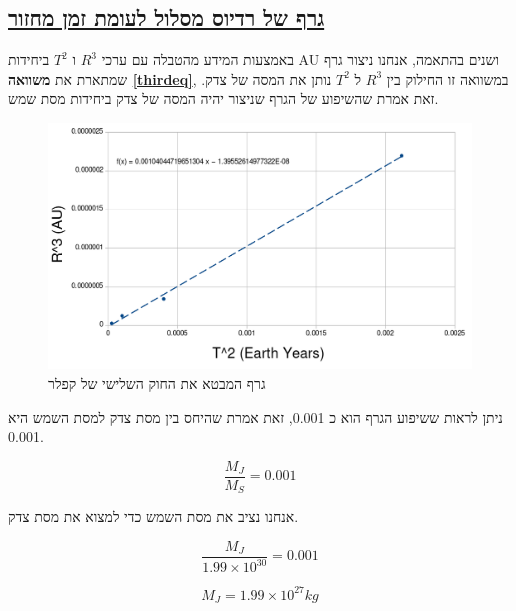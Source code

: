 \documentclass[a4paper, 12pt]{article}
\begin{document}
    \pagebreak %

    \subsection{\underline{גרף של רדיוס מסלול לעומת זמן מחזור}}

    \begin{flushright}
        באמצעות המידע מהטבלה עם ערכי $R^3$ ו $T^2$ ביחידות AU ושנים בהתאמה,
        אנחנו ניצור גרף שמתארת את \textbf{משוואה \ref{thirdeq}}, במשוואה זו החילוק בין
        $R^3$ ל $T^2$ נותן את המסה של צדק.
        זאת אמרת שהשיפוע של הגרף שניצור יהיה המסה של צדק ביחידות מסת שמש.
    \end{flushright}

    \vspace{30pt}

    \begin{figure}[h!]
        \centering
        \includegraphics[width=\textwidth]{../assets/final_graph.png}
        \caption{גרף המבטא את החוק השלישי של קפלר}
    \end{figure}

    \vspace{30pt}

    \begin{flushright}
        ניתן לראות ששיפוע הגרף הוא כ \textenglish{0.001}, זאת אמרת שהיחס בין
        מסת צדק למסת השמש היא \textenglish{0.001}.

        $$ \dfrac{M_J}{M_S} = 0.001 $$

        אנחנו נציב את מסת השמש כדי למצוא את מסת צדק.

        $$ \dfrac{M_J}{1.99\times10^{30}} = 0.001 $$

        $$ M_J = 1.99\times10^{27} kg$$
    \end{flushright}
\end{document}
